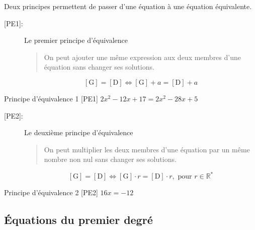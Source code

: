 \documentclass[a4paper,12pt]{article}
\begin{document}
Deux principes permettent de passer d'une équation à une équation équivalente.

\begin{description}
	\item[{[PE1]}:] Le premier principe d'équivalence 

		\begin{quotation}
		On peut ajouter une même expression aux deux membres d'une équation sans changer ses solutions.
		\end{quotation}
		\[[\text{G}]=[\text{D}] \iff [\text{G}] + a= [\text{D}]+a\]
\end{description}
\begin{exemple}
	Principe d'équivalence 1 [PE1]
	\tcblower
	$2x^2-12x+17=2x^2-28x+5$
\vspace{5cm}

\end{exemple}
\begin{description}
	\item[{[PE2]}:] Le deuxième principe d'équivalence 

		\begin{quotation}
		On peut multiplier les deux membres d'une équation par un même nombre non nul sans changer ses solutions.
		\end{quotation}
		\[[\text{G}]=[\text{D}] \iff [\text{G}]\cdot r= [\text{D}]\cdot r, \text{ pour } r \in \mathbb{R}^*\]
\end{description}
\begin{exemple}
	Principe d'équivalence 2 [PE2]
	\tcblower
	$16x=-12$
\vspace{8cm}

\end{exemple}
\newpage
\subsection{Équations du premier degré}
\end{document}
